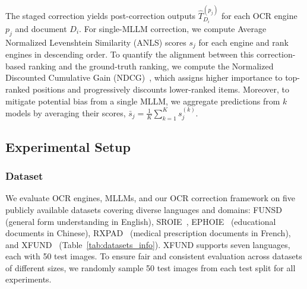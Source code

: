 \documentclass[11pt]{article}
\begin{document}
The staged correction yields post-correction outputs $\hat{T}_{D_i}^{(p_j)}$ for each OCR engine $p_j$ and document $D_i$. For single-MLLM correction, we compute Average Normalized Levenshtein Similarity (ANLS) scores $s_{j}$ for each engine and rank engines in descending order. To quantify the alignment between this correction-based ranking and the ground-truth ranking, we compute the Normalized Discounted Cumulative Gain (NDCG)~\cite{Wang2013-kb}, which assigns higher importance to top-ranked positions and progressively discounts lower-ranked items. Moreover, to mitigate potential bias from a single MLLM, we aggregate predictions from $k$ models by averaging their scores, $\bar{s}_{j}=\frac{1}{K}\sum_{k=1}^{K} s_{j}^{(k)}.$
\subsection{Experimental Setup}
\begin{table}[t]
\centering
\small
\setlength{\tabcolsep}{3pt}
\caption{Summary of adopted datasets. H: Handwritten. LA: Layout Analysis}
\label{tab:datasets_info}
\end{table}


\subsubsection{Dataset}
We evaluate OCR engines, MLLMs, and our OCR correction framework on five publicly available datasets covering diverse languages and domains: FUNSD~\cite{funsd} (general form understanding in English), SROIE~\cite{sroie}, EPHOIE~\cite{ephoie} (educational documents in Chinese), RXPAD~\cite{rxpad} (medical prescription documents in French), and XFUND~\cite{xu2022xfund} (Table~\ref{tab:datasets_info}). XFUND supports seven languages, each with 50 test images. To ensure fair and consistent evaluation across datasets of different sizes, we randomly sample 50 test images from each test split for all experiments. 
 
\end{document}
